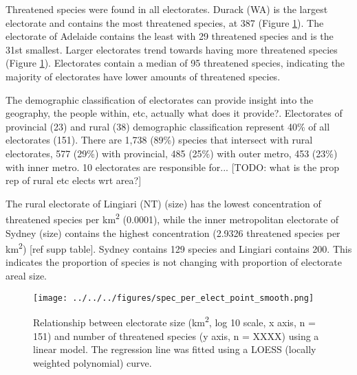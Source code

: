 \documentclass[a4paper,11pt]{article}
\begin{document}

Threatened species were found in all electorates. Durack (WA) is the largest electorate and contains the most threatened species, at 387 (Figure \ref{fig:point_smooth}). The electorate of Adelaide contains the least with 29 threatened species and is the 31st smallest. Larger electorates trend towards having more threatened species (Figure \ref{fig:point_smooth}). Electorates contain a median of 95 threatened species, indicating the majority of electorates have lower amounts of threatened species.

The demographic classification of electorates can provide insight into the geography, the people within, etc, actually what does it provide?. Electorates of provincial (23) and rural (38) demographic classification represent 40\% of all electorates (151). There are 1,738 (89\%) species that intersect with rural electorates, 577 (29\%) with provincial, 485 (25\%) with outer metro, 453 (23\%) with inner metro. 
10 electorates are responsible for...
[TODO: what is the prop rep of rural etc elects wrt area?]

The rural electorate of Lingiari (NT) (size) has the lowest concentration of threatened species per km\textsuperscript{2} (0.0001), while the inner metropolitan electorate of Sydney (size) contains the highest concentration (2.9326 threatened species per km\textsuperscript{2}) [ref supp table]. Sydney contains 129 species and Lingiari contains 200. This indicates the proportion of species is not changing with proportion of electorate areal size.

\begin{figure}[H]
	\centering
    \texttt{[image: ../../../figures/spec\_per\_elect\_point\_smooth.png]}
    \caption{Relationship between electorate size (km\textsuperscript{2}, log 10 scale, x axis, n = 151) and number of threatened species (y axis, n = XXXX) using a linear model. The regression line was fitted using a LOESS (locally weighted polynomial) curve.}
    \label{fig:point_smooth}
\end{figure}
\end{document}
